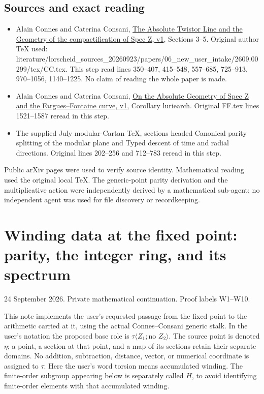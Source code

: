 \documentclass[
  11pt,
]{article}
\providecommand{\tightlist}{%
  \setlength{\itemsep}{0pt}\setlength{\parskip}{0pt}}
\begin{document}
\subsection{Sources and exact reading}\label{sources-and-exact-reading}

\begin{itemize}
\tightlist
\item
  Alain Connes and Caterina Consani,
  \href{https://arxiv.org/html/2609.00299v1\#S3}{The Absolute Twistor
  Line and the Geometry of the compactification of Spec Z, v1}, Sections
  3--5. Original author TeX used:
  literature/lorscheid\_sources\_20260923/papers/06\_new\_user\_intake/2609.00299/tex/CC.tex.
  This step read lines 350--407, 415--548, 557--685, 725--913,
  970--1056, 1140--1225. No claim of reading the whole paper is made.
\item
  Alain Connes and Caterina Consani,
  \href{https://arxiv.org/html/2606.06604v1\#S4.SS1.SSS1}{On the
  Absolute Geometry of Spec Z and the Fargues--Fontaine curve, v1},
  Corollary luriearch. Original FF.tex lines 1521--1587 reread in this
  step.
\item
  The supplied July modular-Cartan TeX, sections headed Canonical parity
  splitting of the modular plane and Typed descent of time and radial
  directions. Original lines 202--256 and 712--783 reread in this step.
\end{itemize}

Public arXiv pages were used to verify source identity. Mathematical
reading used the original local TeX. The generic-point parity derivation
and the multiplicative action were independently derived by a
mathematical sub-agent; no independent agent was used for file discovery
or recordkeeping.

\section{Winding data at the fixed point: parity, the integer ring, and
its
spectrum}\label{winding-data-at-the-fixed-point-parity-the-integer-ring-and-its-spectrum}

24 September 2026. Private mathematical continuation. Proof labels
W1--W10.

This note implements the user's requested passage from the fixed point
to the arithmetic carried at it, using the actual Connes--Consani
generic stalk. In the user's notation the proposed base role is
\(\tau\langle Z_1;\text{no }Z_2\rangle\). The source point is denoted
\(\eta\); a point, a section at that point, and a map of its sections
retain their separate domains. No addition, subtraction, distance,
vector, or numerical coordinate is assigned to \(\tau\). Here the user's
word torsion means accumulated winding. The finite-order subgroup
appearing below is separately called \(H\), to avoid identifying
finite-order elements with that accumulated winding.
\end{document}

